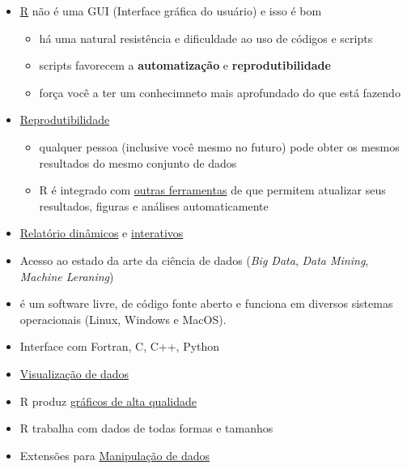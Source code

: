 \documentclass[]{book}
\begin{document}
\begin{itemize}
\item
  \href{https://www.r-project.org/}{R} não é uma GUI (Interface gráfica
  do usuário) e isso é bom

  \begin{itemize}
  \item
    há uma natural resistência e dificuldade ao uso de códigos e scripts
  \item
    scripts favorecem a \textbf{automatização} e
    \textbf{reprodutibilidade}
  \item
    força você a ter um conhecimneto mais aprofundado do que está
    fazendo
  \end{itemize}
\item
  \href{https://pt.wikipedia.org/wiki/Reprodutibilidade}{Reprodutibilidade}

  \begin{itemize}
  \item
    qualquer pessoa (inclusive você mesmo no futuro) pode obter os
    mesmos resultados do mesmo conjunto de dados
  \item
    R é integrado com
    \href{https://cran.r-project.org/web/views/ReproducibleResearch.html}{outras
    ferramentas} de que permitem atualizar seus resultados, figuras e
    análises automaticamente
  \end{itemize}
\item
  \href{https://rmarkdown.rstudio.com/articles_intro.html}{Relatório
  dinâmicos} e \href{http://shiny.rstudio.com/}{interativos}
\item
  Acesso ao estado da arte da ciência de dados (\emph{Big Data},
  \emph{Data Mining}, \emph{Machine Leraning})
\item
  é um software livre, de código fonte aberto e funciona em diversos
  sistemas operacionais (Linux, Windows e MacOS).
\item
  Interface com Fortran, C, C++, Python
\item
  \href{https://cran.r-project.org/web/views/Graphics.html}{Visualização
  de dados}
\item
  R produz
  \href{https://timogrossenbacher.ch/2016/12/beautiful-thematic-maps-with-ggplot2-only/}{gráficos
  de alta qualidade}
\item
  R trabalha com dados de todas formas e tamanhos
\item
  Extensões para
  \href{http://blog.rstudio.org/2014/07/22/introducing-tidyr/}{Manipulação
  de dados}
\end{itemize}
\end{document}
